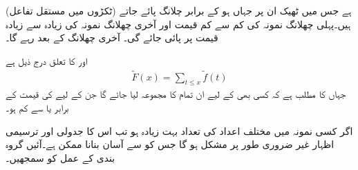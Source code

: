   (ٹکڑوں میں مستقل تفاعل) ہے جس میں ٹھیک ان   پر جہاں  ہو  کے برابر چلانگ پائے جاتے ہیں۔پہلی چھلانگ نمونہ کی کم سے کم قیمت اور آخری چھلانگ نمونہ کی زیادہ سے زیادہ قیمت پر پائی جائے گی۔ آخری چھلانگ  کے بعد  رہے گا۔

 اور  کا تعلق درج ذیل ہے
\begin{align}
\tilde{F}(x)=\sum_{t\le x}\tilde{f}(t)
\end{align}
جہاں  کا مطلب  ہے کہ کسی بھی  کے لیے ان تمام  کا مجموعہ لیا جائے گا جن کے لیے  کی قیمت  کے برابر یا  سے کم ہو۔

اگر کسی نمونہ میں مختلف اعداد کی تعداد بہت زیادہ ہو تب اس کا جدولی اور ترسیمی  اظہار غیر ضروری طور پر مشکل ہو گا جس کو  سے آسان بنانا ممکن ہے۔آئیں گروہ بندی کے عمل کو سمجھیں۔

